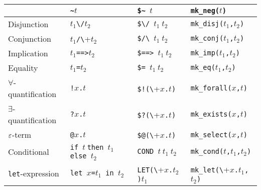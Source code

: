 \begin{center}
\begin{tabular}{|l|l|l|l|}
 & {\small\verb+~+}$t$ & {\small\verb+$~ +}$t$ & {\small\verb+mk_neg(+}$t${\small\verb+)+} \\ \hline
Disjunction & $t_1${\small\verb+\/+}$t_2$ & {\small\verb+$\/ +}$t_1\ t_2$ &
{\small\verb+mk_disj(+}$t_1${\small\verb+,+}$t_2${\small\verb+)+} \\ \hline
%
Conjunction & $t_1${\small\verb+/\+}$t_2$ & {\small\verb+$/\ +}$t_1\ t_2$ &
{\small\verb+mk_conj(+}$t_1${\small\verb+,+}$t_2${\small\verb+)+} \\
\hline
%
Implication & $t_1${\small\verb+==>+}$t_2$ & {\small\verb+$==> +}$t_1\ t_2$ &
{\small\verb+mk_imp(+}$t_1${\small\verb+,+}$t_2${\small\verb+)+} \\ \hline
%
Equality & $t_1${\small\verb+=+}$t_2$ & {\small\verb+$= +}$t_1\ t_2$ &
{\small\verb+mk_eq(+}$t_1${\small\verb+,+}$t_2${\small\verb+)+} \\ \hline
%
$\forall$-quantification & {\small\verb+!+}$x${\small\verb+.+}$t$ &
{\small\verb+$!(\+}$x${\small\verb+.+}$t${\small\verb+)+} & {\small\verb+mk_forall(+}$x${\small\verb+,+}$t${\small\verb+)+} \\ \hline
%
$\exists$-quantification & {\small\verb+?+}$x${\small\verb+.+}$t$ &
{\small\verb+$?(\+}$x${\small\verb+.+}$t${\small\verb+)+} & {\small\verb+mk_exists(+}$x${\small\verb+,+}$t${\small\verb+)+} \\ \hline
%
$\varepsilon$-term & {\small\verb+@+}$x${\small\verb+.+}$t$ &
{\small\verb+$@(\+}$x${\small\verb+.+}$t${\small\verb+)+} & {\small\verb+mk_select(+}$x${\small\verb+,+}$t${\small\verb+)+} \\ \hline
%
Conditional\index{COND@\ml{COND}} & {\small\verb+if +}$t\ ${\small\verb+then +}$t_1${\small\verb+ else +}$t_2$ &
{\small\verb+COND +}$t\ t_1\ t_2$ & {\small\verb+mk_cond(+}$t${\small\verb+,+}$t_1${\small\verb+,+}$t_2${\small\verb+)+}
 \\ \hline
%
{\small\verb+let+}-expression & {\small\verb+let +}$x${\small\verb+=+}$t_1${\small\verb+ in +}$t_2$ &
{\small\verb+LET(\+}$x${\small\verb+.+}$t_2${\small\verb+)+}$t_1$ &
{\small\verb+mk_let(\+}$x${\small\verb+.+}$t_1${\small\verb+,+}$t_2${\small\verb+)+} \\ \hline
\end{tabular}
\end{center}

\bigskip

